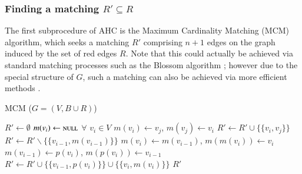 \documentclass[a4paper,11pt,authoryear]{elsarticle}
\begin{document}
\subsubsection{Finding a matching $R' \subseteq R$}
\label{subsub:mcm}
\noindent The first subprocedure of AHC is the Maximum Cardinality Matching (MCM) algorithm, which seeks a matching $R'$ comprising $n+1$ edges on the graph induced by the set of red edges $R$. Note that this could actually be achieved via standard matching processes such as the Blossom algorithm \citep{edmonds1965}; however due to the special structure of $G$, such a matching can also be achieved via more efficient methods \citep{mahadev1994, becker2015}.

\begin{algorithm}[h]
\caption{MCM ($G = (V, B \cup R)$)}
\begin{algorithmic}[1]
	\State $R' \gets \emptyset$
	\State $m(v_i) \gets \textsc{null}$ $\forall$ $v_i \in V$
				\State $m(v_i) \gets v_j$, $m(v_j) \gets v_i$
				\State $R' \gets R' \cup \{\{v_i, v_j\}\}$
				\Break
			\EndIf
		\EndFor
			\State $R' \gets R' \backslash \{\{v_{i-1}, m(v_{i-1})\}\}$
			\State $m(v_i) \gets m(v_{i-1})$, $m(m(v_i)) \gets v_i$
			\State $m(v_{i-1}) \gets p(v_i)$, $m(p(v_i)) \gets v_{i-1}$
			\State $R' \gets R' \cup \{\{v_{i-1}, p(v_i)\}\} \cup \{\{v_i, m(v_i)\}\}$
		\EndIf
	\EndFor
	\Return $R'$
\end{algorithmic}
\label{alg:mcm}	
\end{algorithm}

\end{document}
